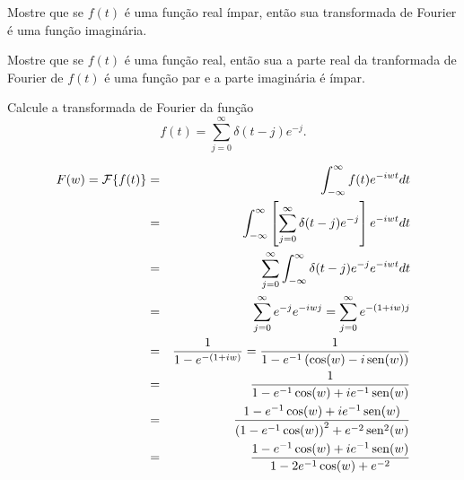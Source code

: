 \begin{Exercise} Mostre que se $f(t)$ é uma função real ímpar, então sua transformada de Fourier é uma função imaginária.
\end{Exercise}

\begin{Exercise} Mostre que se $f(t)$ é uma função real, então sua a parte real da tranformada de Fourier de $f(t)$ é uma função par e a parte imaginária é ímpar.
\end{Exercise}


\begin{Exercise} Calcule a transformada de Fourier da função
$$f(t)=\sum_{j=0}^\infty \delta(t-j) e^{-j}.$$
\end{Exercise}
\begin{Answer} 
\begin{eqnarray*}
F(w)=\mathcal{F}\{f(t)\}&=&\int_{-\infty}^\infty f(t) e^{-i w t}dt\\
&=&\int_{-\infty}^\infty \left[\sum_{j=0}^\infty\delta(t-j)e^{-j}\right] e^{-i w t}dt\\
&=&\sum_{j=0}^\infty\int_{-\infty}^\infty \delta(t-j)e^{-j} e^{-i w t}dt\\
&=&\sum_{j=0}^\infty e^{-j} e^{-i w j}
=\sum_{j=0}^\infty e^{-(1+i w) j}\\
&=&\frac{1}{1-e^{-(1+i w)}}=\frac{1}{1-e^{-1}\left(\cos(w)-i\operatorname{sen}(w)\right)}\\
&=&\frac{1}{1-e^{-1}\cos(w)+ie^{-1}\operatorname{sen}(w)}\\
&=&\frac{1-e^{-1}\cos(w)+ie^{-1}\operatorname{sen}(w)}{\left(1-e^{-1}\cos(w)\right)^2+e^{-2}\operatorname{sen}^2(w)}\\
&=&\frac{1-e^{-1}\cos(w)+ie^{-1}\operatorname{sen}(w)}{1-2e^{-1}\cos(w)+e^{-2}}\\
\end{eqnarray*}

\end{Answer}

%